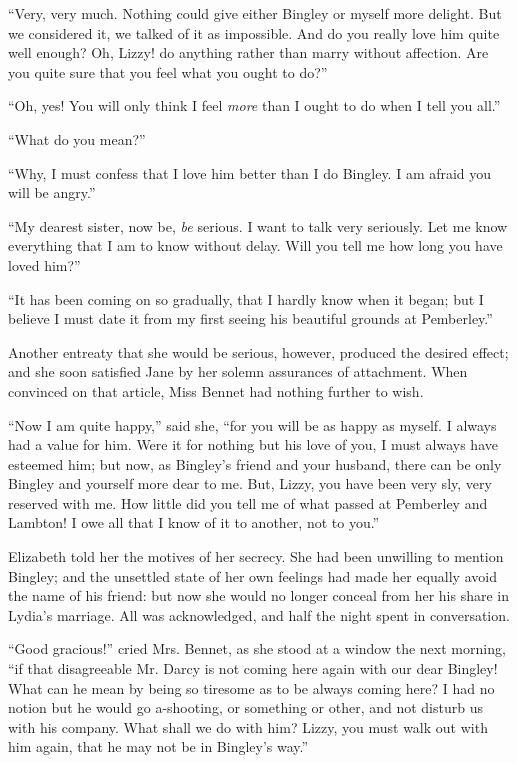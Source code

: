\documentclass[12pt,openright]{book}
\begin{document}
“Very, very much. Nothing could give either Bingley or myself more delight. But we considered it, we talked of it as impossible. And do you really love him quite well enough? Oh, Lizzy! do anything rather than marry without affection. Are you quite sure that you feel what you ought to do?”

“Oh, yes! You will only think I feel \textit{more} than I ought to do when I tell you all.”

“What do you mean?”

“Why, I must confess that I love him better than I do Bingley. I am afraid you will be angry.”

“My dearest sister, now be, \textit{be} serious. I want to talk very seriously. Let me know everything that I am to know without delay. Will you tell me how long you have loved him?”

“It has been coming on so gradually, that I hardly know when it began; but I believe I must date it from my first seeing his beautiful grounds at Pemberley.”

Another entreaty that she would be serious, however, produced the desired effect; and she soon satisfied Jane by her solemn assurances of attachment. When convinced on that article, Miss Bennet had nothing further to wish.

“Now I am quite happy,” said she, “for you will be as happy as myself. I always had a value for him. Were it for nothing but his love of you, I must always have esteemed him; but now, as Bingley’s friend and your husband, there can be only Bingley and yourself more dear to me. But, Lizzy, you have been very sly, very reserved with me. How little did you tell me of what passed at Pemberley and Lambton! I owe all that I know of it to another, not to you.”

Elizabeth told her the motives of her secrecy. She had been unwilling to mention Bingley; and the unsettled state of her own feelings had made her equally avoid the name of his friend: but now she would no longer conceal from her his share in Lydia’s marriage. All was acknowledged, and half the night spent in conversation.

“Good gracious!” cried Mrs. Bennet, as she stood at a window the next morning, “if that disagreeable Mr. Darcy is not coming here again with our dear Bingley! What can he mean by being so tiresome as to be always coming here? I had no notion but he would go a-shooting, or something or other, and not disturb us with his company. What shall we do with him? Lizzy, you must walk out with him again, that he may not be in Bingley’s way.”
\end{document}
